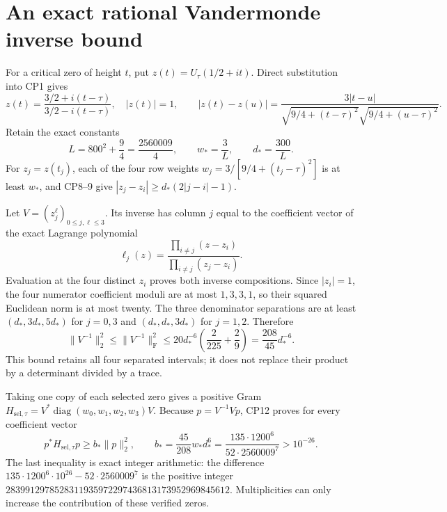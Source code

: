 \documentclass[11pt]{article}
\newcommand{\diag}{\operatorname{diag}}
\begin{document}
\section{An exact rational Vandermonde inverse bound}
For a critical zero of height $t$, put $z(t)=U_\tau(1/2+it)$.
Direct substitution into CP1 gives
\begin{equation}
z(t)=\frac{3/2+i(t-\tau)}{3/2-i(t-\tau)},\quad |z(t)|=1,\qquad
|z(t)-z(u)|
=\frac{3|t-u|}
 {\sqrt{9/4+(t-\tau)^2}\sqrt{9/4+(u-\tau)^2}}.
\tag{CP9}
\end{equation}
Retain the exact constants
\begin{equation}
L=800^2+\frac94=\frac{2560009}{4},\qquad
w_*=\frac3L,\qquad d_*=\frac{300}{L}.
\tag{CP10}
\end{equation}
For $z_j=z(t_j)$, each of the four row weights
$w_j=3/[9/4+(t_j-\tau)^2]$ is at least $w_*$, and
CP8--9 give
$|z_j-z_i|\ge d_*(2|j-i|-1)$.

Let $V=(z_j^\ell)_{0\le j,\ell\le3}$.
Its inverse has column $j$ equal to the coefficient vector of
the exact Lagrange polynomial
\begin{equation}
\ell_j(z)=\frac{\prod_{i\ne j}(z-z_i)}
                     {\prod_{i\ne j}(z_j-z_i)}.
\tag{CP11}
\end{equation}
Evaluation at the four distinct $z_i$ proves both inverse
compositions. Since $|z_i|=1$, the four numerator coefficient
moduli are at most $1,3,3,1$, so their squared Euclidean norm
is at most twenty. The three denominator separations are
at least $(d_*,3d_*,5d_*)$ for $j=0,3$ and
$(d_*,d_*,3d_*)$ for $j=1,2$. Therefore
\begin{equation}
\|V^{-1}\|_2^2\le\|V^{-1}\|_{\mathrm F}^2
\le20d_*^{-6}\left(\frac2{225}+\frac2{9}\right)
=\frac{208}{45}d_*^{-6}.
\tag{CP12}
\end{equation}
This bound retains all four separated intervals; it does not
replace their product by a determinant divided by a trace.

Taking one copy of each selected zero gives a positive Gram
$H_{\mathrm{sel},\tau}=V^*\diag(w_0,w_1,w_2,w_3)V$.
Because $p=V^{-1}Vp$, CP12 proves for every coefficient vector
\begin{equation}
p^*H_{\mathrm{sel},\tau}p\ge b_*\|p\|_2^2,\qquad
b_*=\frac{45}{208}w_*d_*^6
=\frac{135\cdot1200^6}{52\cdot2560009^7}>10^{-26}.
\tag{CP13}
\end{equation}
The last inequality is exact integer arithmetic: the difference
$135\cdot1200^6\cdot10^{26}-52\cdot2560009^7$ is the positive
integer
$2839912978528311935972297436813173952969845612$.
Multiplicities can only increase the contribution of these
verified zeros.
\end{document}
